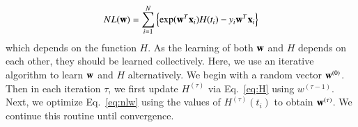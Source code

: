 \begin{equation}\label{eq:nlw}
NL(\mb{w})=\sum_{i=1}^{N}\left\lbrace\exp(\mb{w}^T\mb{x}_i)H(t_i)-y_i\mb{w}^T\mb{x}_i\right\rbrace
\end{equation}
which depends on the function $H$. As the learning of both $\mathbf{w}$ and $H$ depends on each other, they should be learned collectively. Here, we use an iterative algorithm to learn $\mathbf{w}$ and $H$ alternatively. We begin with a random vector $\mathbf{w}^{(0)}$. Then in each iteration $\tau$, we first update $H^{(\tau)}$ via Eq.~\ref{eq:H} using $w^{(\tau-1)}$. Next, we optimize Eq.~\ref{eq:nlw} using the values of $H^{(\tau)}(t_i)$ to obtain $\mathbf{w}^{(\tau)}$. We continue this routine until convergence.

%		


